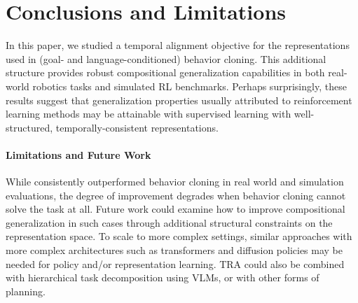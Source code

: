 \section{Conclusions and Limitations}
\label{sec:conclusion}

In this paper, we studied a temporal alignment objective for the representations used in (goal- and language-conditioned) behavior cloning.
This additional structure provides robust compositional generalization capabilities in both real-world robotics tasks and simulated RL benchmarks.
Perhaps surprisingly, these results suggest that generalization properties usually attributed to reinforcement learning methods may be attainable with supervised learning with well-structured, temporally-consistent representations.

\paragraph{Limitations and Future Work}
            While \Method{} consistently outperformed behavior cloning in real world and simulation evaluations, the degree of improvement degrades when behavior cloning cannot solve the task at all.
    Future work could examine how to improve compositional generalization in such cases through additional structural constraints on the representation space.
    To scale to more complex settings, similar approaches with more complex architectures such as transformers and diffusion policies may be needed for policy and/or representation learning.
    TRA could also be combined with hierarchical task decomposition using VLMs, or with other forms of planning.

